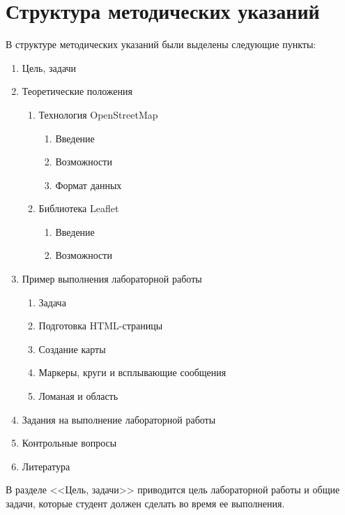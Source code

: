 \documentclass[a4paper, 14pt]{extreport}
\begin{document}
    \chapter{Структура методических указаний}
    В структуре методических указаний были выделены следующие пункты:
    \begin{enumerate}
        \item Цель, задачи
        \item Теоретические положения
        \begin{enumerate}
            \item Технология OpenStreetMap
            \begin{enumerate}
                \item Введение
                \item Возможности
                \item Формат данных
            \end{enumerate}
            \item Библиотека Leaflet
            \begin{enumerate}
                \item Введение
                \item Возможности
            \end{enumerate}
        \end{enumerate}
        \item Пример выполнения лабораторной работы
        \begin{enumerate}
            \item Задача
            \item Подготовка HTML-страницы
            \item Создание карты
            \item Маркеры, круги и всплывающие сообщения
            \item Ломаная и область
        \end{enumerate}
        \item Задания на выполнение лабораторной работы
        \item Контрольные вопросы
        \item Литература
    \end{enumerate}

    \newpage

    В разделе <<Цель, задачи>> приводится цель лабораторной работы и общие
    задачи, которые студент должен сделать во время ее выполнения.
\end{document}
